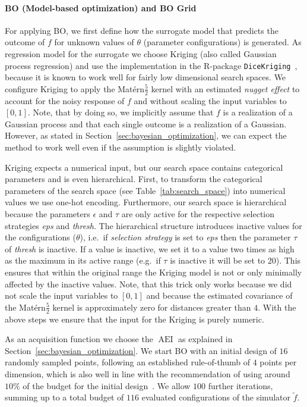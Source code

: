\documentclass[bimj,fleqn]{w-art}
\theoremstyle{plain}
\theoremstyle{definition}
\begin{document}
\paragraph{BO (Model-based optimization) and BO Grid}
For applying BO, we first define how the surrogate model that predicts the outcome of $f$ for unknown values of $\theta$ (parameter configurations) is generated.
As regression model for the surrogate we choose Kriging (also called Gaussian process regression) and use the implementation in the R-package \texttt{DiceKriging}~\citep{roustant_dicekriging_2012}, because it is known to work well for fairly low dimensional search spaces.
We configure Kriging to apply the Matérn$\frac{5}{2}$ kernel with an estimated \emph{nugget effect} to account for the noisy response of $f$ and without scaling the input variables to $[0,1]$.
Note, that by doing so, we implicitly assume that $f$ is a realization of a Gaussian process and that each single outcome is a realization of a Gaussian.
However, as stated in Section~\ref{sec:bayesian_optimization}, we can expect the method to work well even if the assumption is slightly violated.


Kriging expects a numerical input, but our search space contains categorical parameters and is even hierarchical.
First, to transform the categorical parameters of the search space (see Table~\ref{tab:search_space}) into numerical values we use one-hot encoding.
Furthermore, our search space is hierarchical because the parameters $\epsilon$ and $\tau$ are only active for the respective selection strategies \emph{eps} and \emph{thresh}.
The hierarchical structure introduces inactive values for the configurations ($\theta$), i.e.\ if \emph{selection strategy} is set to \emph{eps} then the parameter $\tau$ of \emph{thresh} is inactive.
If a value is inactive, we set it to a value two times as high as the maximum in its active range (e.g.\ if $\tau$ is inactive it will be set to 20).
This ensures that within the original range the Kriging model is not or only minimally affected by the inactive values.
Note, that this trick only works because we did not scale the input variables to $[0,1]$ and because the estimated covariance of the Matérn$\frac{5}{2}$ kernel is approximately zero for distances greater than $4$.
With the above steps we ensure that the input for the Kriging is purely numeric.

As an acquisition function we choose the $\operatorname{AEI}$ as explained in Section~\ref{sec:bayesian_optimization}.
We start BO with an initial design of $16$ randomly sampled points, following an established rule-of-thumb of $4$ points per dimension, which is also well in line with the recommendation of using around $10\%$ of the budget for the initial design~\citep{bossek_initial_2020}.
We allow $100$ further iterations, summing up to a total budget of $116$ evaluated configurations of the simulator $\tilde{f}$.
\end{document}
